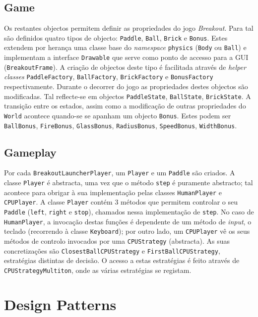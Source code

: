 \documentclass[a4paper]{article}
\begin{document}
\subsection{Game}
Os restantes objectos permitem definir as propriedades do jogo \emph{Breakout}. Para tal são definidos quatro tipos de objecto: \texttt{Paddle}, \texttt{Ball}, \texttt{Brick} e \texttt{Bonus}. Estes extendem por herança uma classe base do \emph{namespace} \texttt{physics} (\texttt{Body} ou \texttt{Ball}) e implementam a interface \texttt{Drawable} que serve como ponto de accesso para a GUI (\texttt{BreakoutFrame}). A criação de objectos deste tipo é facilitada através de \emph{helper classes} \texttt{PaddleFactory}, \texttt{BallFactory}, \texttt{BrickFactory} e \texttt{BonusFactory} respectivamente. Durante o decorrer do jogo as propriedades destes objectos são modificadas. Tal reflecte-se em objectos \texttt{PaddleState}, \texttt{BallState}, \texttt{BrickState}. A transição entre os estados, assim como a modificação de outras propriedades do \texttt{World} acontece quando-se se apanham um objecto \texttt{Bonus}. Estes podem ser \texttt{BallBonus}, \texttt{FireBonus}, \texttt{GlassBonus}, \texttt{RadiusBonus}, \texttt{SpeedBonus}, \texttt{WidthBonus}.

\subsection{Gameplay}
\noindent Por cada \texttt{BreakoutLauncherPlayer}, um \texttt{Player} e um \texttt{Paddle} são criados. A classe \texttt{Player} é abstracta, uma vez que o método \texttt{step} é puramente abstracto; tal acontece para obrigar à sua implementação pelas classes \texttt{HumanPlayer} e \texttt{CPUPlayer}. A classe \texttt{Player} contém 3 métodos que permitem controlar o seu \texttt{Paddle} (\texttt{left}, \texttt{right} e \texttt{stop}), chamados nessa implementação de \texttt{step}. No caso de \texttt{HumanPlayer}, a invocação destas funções é dependente de um método de \textit{input}, o teclado (recorrendo à classe \texttt{Keyboard}); por outro lado, um \texttt{CPUPlayer} vê os seus métodos de controlo invocados por uma \texttt{CPUStrategy} (abstracta). As suas concretizações são \texttt{ClosestBallCPUStrategy} e \texttt{FirstBallCPUStrategy}, estratégias distintas de decisão. O acesso a estas estratégias é feito através de \texttt{CPUStrategyMultiton}, onde as várias estratégias se registam.

\clearpage


\section{Design Patterns}
\end{document}
